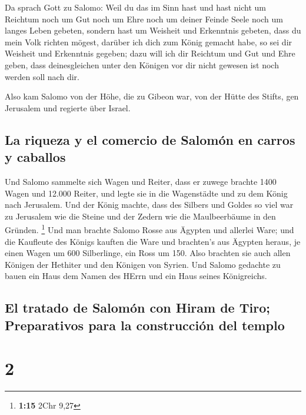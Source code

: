  Da sprach Gott zu Salomo: Weil du das im Sinn hast und
hast nicht um Reichtum noch um Gut noch um Ehre noch um deiner Feinde
Seele noch um langes Leben gebeten, sondern hast um Weisheit und
Erkenntnis gebeten, dass du mein Volk richten mögest, darüber ich dich
zum König gemacht habe,  so sei dir Weisheit und
Erkenntnis gegeben; dazu will ich dir Reichtum und Gut und Ehre geben,
dass deinesgleichen unter den Königen vor dir nicht gewesen ist noch
werden soll nach dir.

 Also kam Salomo von der Höhe, die zu Gibeon war, von der
Hütte des Stifts, gen Jerusalem und regierte über Israel.

\hypertarget{la-riqueza-y-el-comercio-de-salomuxf3n-en-carros-y-caballos}{%
\subsection{La riqueza y el comercio de Salomón en carros y
caballos}\label{la-riqueza-y-el-comercio-de-salomuxf3n-en-carros-y-caballos}}

 Und Salomo sammelte sich Wagen und Reiter, dass er
zuwege brachte 1400 Wagen und 12.000 Reiter, und legte sie in die
Wagenstädte und zu dem König nach Jerusalem.  Und der
König machte, dass des Silbers und Goldes so viel war zu Jerusalem wie
die Steine und der Zedern wie die Maulbeerbäume in den Gründen.
\footnote{\textbf{1:15} 2Chr 9,27}  Und man brachte
Salomo Rosse aus Ägypten und allerlei Ware; und die Kaufleute des Königs
kauften die Ware  und brachten's aus Ägypten heraus, je
einen Wagen um 600 Silberlinge, ein Ross um 150. Also brachten sie auch
allen Königen der Hethiter und den Königen von Syrien. 
Und Salomo gedachte zu bauen ein Haus dem Namen des HErrn und ein Haus
seines Königreichs.

\hypertarget{el-tratado-de-salomuxf3n-con-hiram-de-tiro-preparativos-para-la-construcciuxf3n-del-templo}{%
\subsection{El tratado de Salomón con Hiram de Tiro; Preparativos para
la construcción del
templo}\label{el-tratado-de-salomuxf3n-con-hiram-de-tiro-preparativos-para-la-construcciuxf3n-del-templo}}

\hypertarget{section-1}{%
\section{2}\label{section-1}}

